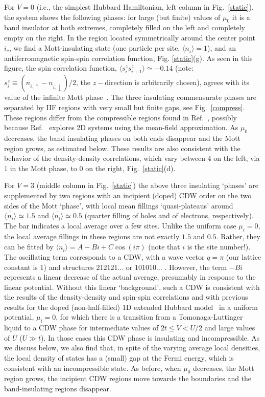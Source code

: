 \documentclass[aps,prl,showpacs,twocolumn,superscriptaddress]{revtex4-2}
\begin{document}
For $V=0$ (i.e., the simplest Hubbard Hamiltonian, left column in Fig.~\ref{static}), the system shows the following phases: for large (but finite) values of $\mu^{}_0$ it is a band insulator at both extremes,  completely filled  on the left and  completely empty  on the right. In the region located symmetrically around the center point $i^{}_c$, we find a Mott-insulating state (one particle per site, $\langle n^{}_i\rangle=1$),  and an antiferromagnetic spin-spin correlation function, Fig. \ref{static}(g). As seen in this figure, the  spin correlation function, $\langle s^z_i s^{z}_{i+1}\rangle\simeq-0.14$ (note: $s_i^z\equiv (n^{}_{i,\uparrow}-n^{}_{i,\downarrow})/2$, the $z-$direction is arbitrarily chosen), agrees with its value of the infinite Mott phase~\cite{whiteprb}.  The three insulating commensurate phases are separated by IIF regions with very small but finite gaps, see Fig.~\ref{compress}. These regions differ from the compressible regions found in Ref.~\cite{HF}, possibly because Ref.~\cite{HF} explores 2D systems using the mean-field approximation.
As $\mu^{}_0$ decreases, the band insulating phases on both ends disappear and the Mott region grows, as estimated below. These results are also consistent with the behavior of the density-density  correlations, which vary between $4$ on the left, via $1$ in the Mott phase, to $0$ on the right, Fig.~\ref{static}(d).

For $V=3$ (middle column in Fig.~\ref{static}) the above three insulating `phases' are supplemented by
two regions with an incipient (doped) CDW order on the two sides of the Mott `phase', with local mean fillings `quasi-plateaus' around $\overline{\langle ^{}n_i\rangle} \simeq 1.5$ and $\overline{\langle n^{}_i\rangle} \simeq 0.5$ (quarter filling of holes and of electrons, respectively). The bar indicates a local average over a few sites.
 Unlike the uniform case $\mu^{}_i=0$, the local average fillings in these regions are not exactly $1.5$ and $0.5$. Rather, they can be fitted by $\langle n^{}_i\rangle =A-Bi+C\cos(i\pi)$ (note that $i$ is the site number!). The oscillating term corresponds to a CDW, with a wave vector $q=\pi$  (our lattice constant is $1$) and  structures $212121\dots$ or $101010\dots$ \cite{Com}. However, the term $-Bi$ represents a linear decrease of the actual average, presumably in response to the linear potential. Without this linear `background', such a CDW is consistent with the results of the density-density and spin-spin correlations and with previous results for the doped (non-half-filled) 1D extended Hubbard model~\cite{nakamura} in a uniform potential, $\mu^{}_i=0$, for which there is a transition from a Tomonaga-Luttinger liquid to a CDW phase for intermediate values of $2t\leq V<U/2$ and large values of $U$ ($U\gg t$). In those cases this CDW phase is insulating and incompressible.
As we discuss below, we also find that, in spite of the varying average local densities, the local density of states has a (small) gap at the Fermi energy, which is consistent with an incompressible state.
 As before, when $\mu^{}_0$ decreases, the Mott region grows, the incipient CDW regions move towards the boundaries and the band-insulating regions disappear.
\end{document}
